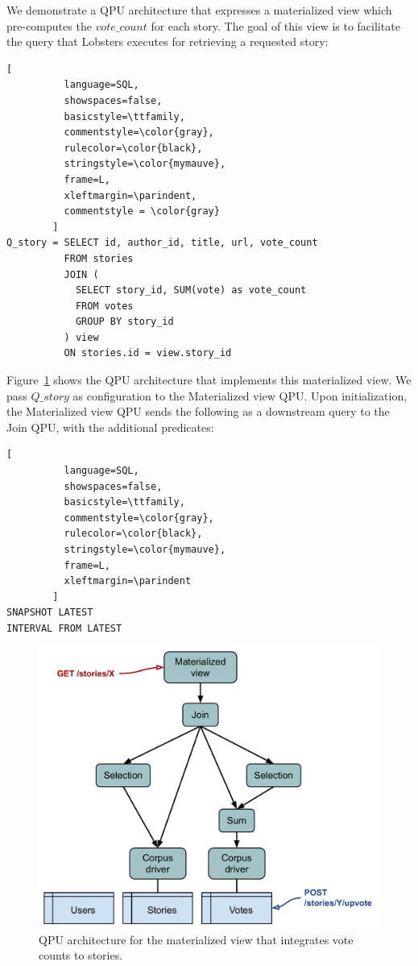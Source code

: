 \noindent
We demonstrate a QPU architecture that expresses a materialized view which pre-computes the $vote\_count$ for each story.
The goal of this view is to facilitate the query that Lobsters executes for retrieving a requested story:

\begin{lstlisting}[
          language=SQL,
          showspaces=false,
          basicstyle=\ttfamily,
          commentstyle=\color{gray},
          rulecolor=\color{black},
          stringstyle=\color{mymauve},
          frame=L,
          xleftmargin=\parindent,
          commentstyle = \color{gray}
        ]
Q_story = SELECT id, author_id, title, url, vote_count
          FROM stories
          JOIN (
            SELECT story_id, SUM(vote) as vote_count
            FROM votes
            GROUP BY story_id
          ) view
          ON stories.id = view.story_id
\end{lstlisting}

\noindent
Figure~\ref{fig:lobsters_architecture_basic} shows the QPU architecture that implements this materialized view.
We pass $Q\_story$ as configuration to the Materialized view QPU.
Upon initialization, the Materialized view QPU sends the following as a downstream query to the Join QPU,
with the additional predicates:

\begin{lstlisting}[
          language=SQL,
          showspaces=false,
          basicstyle=\ttfamily,
          commentstyle=\color{gray},
          rulecolor=\color{black},
          stringstyle=\color{mymauve},
          frame=L,
          xleftmargin=\parindent
        ]
SNAPSHOT LATEST
INTERVAL FROM LATEST
\end{lstlisting}

\begin{figure}[t]
  \centering
    \includegraphics[scale=0.5]{./figures/case_studies/lobsters_architecture_basic.pdf}
  \caption{QPU architecture for the materialized view that integrates vote counts to stories.}
  \label{fig:lobsters_architecture_basic}
\end{figure}

